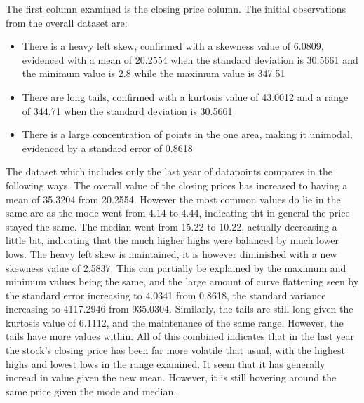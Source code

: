 The first column examined is the closing price column. The initial observations from the overall dataset are:
\begin{itemize}
    \item There is a heavy left skew, confirmed with a skewness value of 6.0809, evidenced with a mean of 20.2554 when the standard deviation is 30.5661 and the minimum value is 2.8 while the maximum value is 347.51
    \item There are long tails, confirmed with a kurtosis value of 43.0012 and a range of 344.71 when the standard deviation is 30.5661
    \item There is a large concentration of points in the one area, making it unimodal, evidenced by a standard error of 0.8618
\end{itemize}
The dataset which includes only the last year of datapoints compares in the following ways. The overall value of the closing prices has increased to having a mean of 35.3204 from 20.2554. However the most common values do lie in the same are as the mode went from 4.14 to 4.44, indicating tht in general the price stayed the same. The median went from 15.22 to 10.22, actually decreasing a little bit, indicating that the much higher highs were balanced by much lower lows. The heavy left skew is maintained, it is however diminished with a new skewness value of 2.5837. This can partially be explained by the maximum and minimum values being the same, and the large amount of curve flattening seen by the standard error increasing to 4.0341 from 0.8618, the standard variance increasing to 4117.2946 from 935.0304. Similarly, the tails are still long given the kurtosis value of 6.1112, and the maintenance of the same range. However, the tails have more values within. All of this combined indicates that in the last year the stock's closing price has been far more volatile that usual, with the highest highs and lowest lows in the range examined. It seem that it has generally incread in value given the new mean. However, it is still hovering around the same price given the mode and median.

